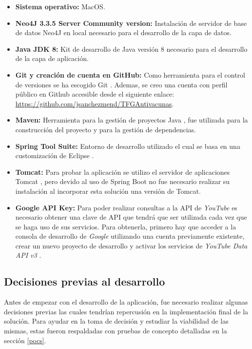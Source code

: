 \documentclass[11pt,a4paper]{article}
\begin{document}
\begin{itemize}
\item \textbf{Sistema operativo:} MacOS.
\item \textbf{Neo4J 3.3.5 Server Community version:} Instalación de servidor de base de datos Neo4J en local necesario para el desarrollo de la capa de datos.
\item \textbf{Java JDK 8:} Kit de desarrollo de Java versión 8 \cite{21} necesario para el desarrollo de la capa de aplicación.
\item \textbf{Git y creación de cuenta en GitHub:} Como herramienta para el control de versiones se ha escogido Git \cite{22}. Ademas, se creo una cuenta con perfil público en Github accesible desde el siguiente enlace: \url{https://github.com/jsanchezmend/TFGAntivacunas}.
\item \textbf{Maven:} Herramienta para la gestión de proyectos Java \cite{23}, fue utilizada para la construcción del proyecto y para la gestión de dependencias.
\item \textbf{Spring Tool Suite:} Entorno de desarrollo utilizado el cual se basa en una customización de Eclipse \cite{24}.
\item \textbf{Tomcat:} Para probar la aplicación se utilizo el servidor de aplicaciones Tomcat \cite{25}, pero devido al uso de Spring Boot \cite{26} no fue necesario realizar su instalación al incorporar esta solución una versión de Tomcat.
\item \textbf{Google API Key:} Para poder realizar consultas a la API de \textit{YouTube} es necesario obtener una clave de API que tendrá que ser utilizada cada vez que se haga uso de sus servicios. Para obtenerla, primero hay que acceder a la consola de desarrollo de \textit{Google} utilizando una cuenta previamente existente, crear un nuevo proyecto de desarrollo y activar los servicios de \textit{YouTube Data API v3} \cite{27}.
\end{itemize}
\medskip 

\subsection{Decisiones previas al desarrollo}
Antes de empezar con el desarrollo de la aplicación, fue necesario realizar algunas decisiones previas las cuales tendrían repercusión en la implementación final de la solución.  Para ayudar en la toma de decisión y estudiar la viabilidad de las mismas, estas fueron respaldadas con pruebas de concepto detalladas en la sección \ref{pocs}.
\\
\end{document}
